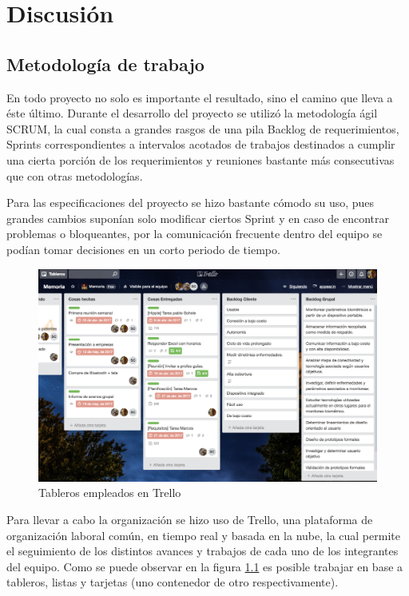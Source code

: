 \chapter{Discusión}\label{discusion}

\section{Metodología de trabajo}

En todo proyecto no solo es importante el resultado, sino el camino que lleva a éste último. Durante el desarrollo del proyecto se utilizó la metodología ágil SCRUM, la cual consta a grandes rasgos de una pila Backlog de requerimientos, Sprints correspondientes a intervalos acotados de trabajos destinados a cumplir una cierta porción de los requerimientos y reuniones bastante más consecutivas que con otras metodologías. 

Para las especificaciones del proyecto se hizo bastante cómodo su uso, pues grandes cambios suponían solo modificar ciertos Sprint y en caso de encontrar problemas o bloqueantes, por la comunicación frecuente dentro del equipo se podían tomar decisiones en un corto periodo de tiempo.

\begin{figure}[H]
	\centering
	\includegraphics[scale=0.3]{figuras/discusion/trello.png}
	\caption{Tableros empleados en Trello}
	\label{trello}
\end{figure}


Para llevar a cabo la organización se hizo uso de Trello, una plataforma de organización laboral común, en tiempo real y basada en la nube, la cual permite el seguimiento de los distintos avances y trabajos de cada uno de los integrantes del equipo. Como se puede observar en la figura \ref{trello} es posible trabajar en base a tableros, listas y tarjetas (uno contenedor de otro respectivamente).


